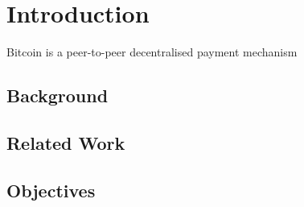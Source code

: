 \chapter{Introduction}
\label{chp:Intro}

Bitcoin \cite{Nakamoto2008} is a peer-to-peer decentralised payment mechanism 


\section{Background}
	

\section{Related Work}

\section{Objectives}



